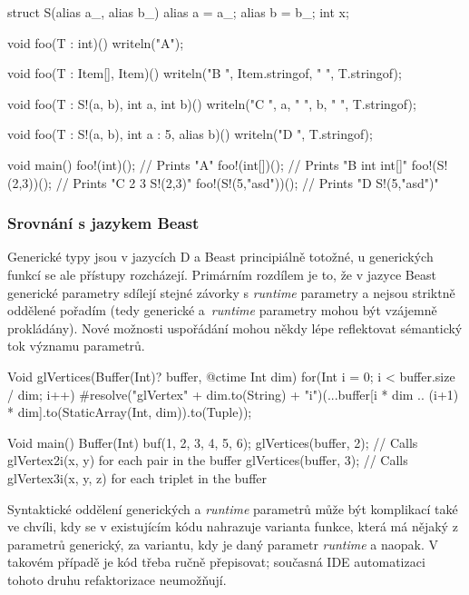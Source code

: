 \begin{dcode}
struct S(alias a_, alias b_) {
	alias a = a_;
	alias b = b_;
	int x;
}

void foo(T : int)() {
	writeln("A");
}

void foo(T : Item[], Item)() {
	writeln("B ", Item.stringof, " ", T.stringof);
}

void foo(T : S!(a, b), int a, int b)() {
	writeln("C ", a, " ", b, " ", T.stringof);
}

void foo(T : S!(a, b), int a : 5, alias b)() {
	writeln("D ", T.stringof);
}

void main() {
	foo!(int)(); // Prints "A\n"
	foo!(int[])(); // Prints "B int int[]\n"
	foo!(S!(2,3))(); // Prints "C 2 3 S!(2,3)\n"
	foo!(S!(5,"asd"))(); // Prints "D S!(5,"asd")\n"
}
\end{dcode}

\subsubsection{Srovnání s jazykem Beast}
Generické typy jsou v jazycích D a Beast principiálně totožné, u generických funkcí se ale přístupy rozcházejí. Primárním rozdílem je to, že v jazyce Beast generické parametry sdílejí stejné závorky s \textit{runtime} parametry a nejsou striktně oddělené pořadím (tedy generické a~\textit{runtime} parametry mohou být vzájemně prokládány). Nové možnosti uspořádání mohou někdy lépe reflektovat sémantický tok významu parametrů.

\begin{code}
Void glVertices(Buffer(Int)? buffer, @ctime Int dim) {
	for(Int i = 0; i < buffer.size / dim; i++)
		#resolve("glVertex" + dim.to(String) + "i")(...buffer[i * dim .. (i+1) * dim].to(StaticArray(Int, dim)).to(Tuple));
}

Void main() {
	Buffer(Int) buf(1, 2, 3, 4, 5, 6);
	glVertices(buffer, 2); // Calls glVertex2i(x, y) for each pair in the buffer
	glVertices(buffer, 3); // Calls glVertex3i(x, y, z) for each triplet in the buffer
}
\end{code}

Syntaktické oddělení generických a \textit{runtime} parametrů může být komplikací také ve chvíli, kdy se v existujícím kódu nahrazuje varianta funkce, která má nějaký z parametrů generický, za variantu, kdy je daný parametr \textit{runtime} a naopak. V takovém případě je kód třeba ručně přepisovat; současná IDE automatizaci tohoto druhu refaktorizace neumožňují.

